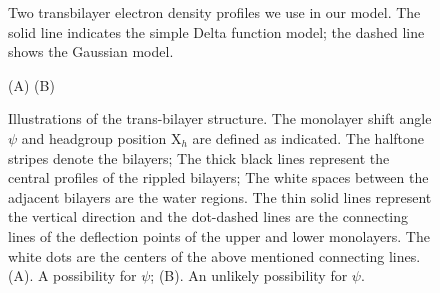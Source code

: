\begin{figure}
\centerline{}
\caption{
Two transbilayer electron density profiles we use in our model.
The solid line indicates the simple Delta function model; the dashed line
shows the Gaussian model.
\label{transedp}}
\end{figure}

\begin{figure}
\begin{center}
\leavevmode
\raggedleft 
\hspace{0.2in}
\leavevmode
\raggedright 
\hspace{0.7in}
\end{center}
\vspace{-0.2in}
\hspace{1.2in} (A) \hspace{2.7in} (B)
\vspace{0.2in}
\caption{Illustrations of the trans-bilayer structure. The monolayer
shift angle $\psi$ and headgroup position X$_h$ are defined as
indicated. The halftone stripes denote the bilayers; The thick black lines 
represent the central profiles of the rippled bilayers; The white spaces
between the adjacent bilayers are the water regions. The thin solid
lines represent the vertical direction and the dot-dashed lines are the
connecting lines of the deflection points of the upper and lower monolayers.
The white dots are the centers of the above mentioned connecting lines. 
(A). A possibility for $\psi$; (B). An unlikely possibility for $\psi$.
\label{trans}}
\end{figure}

